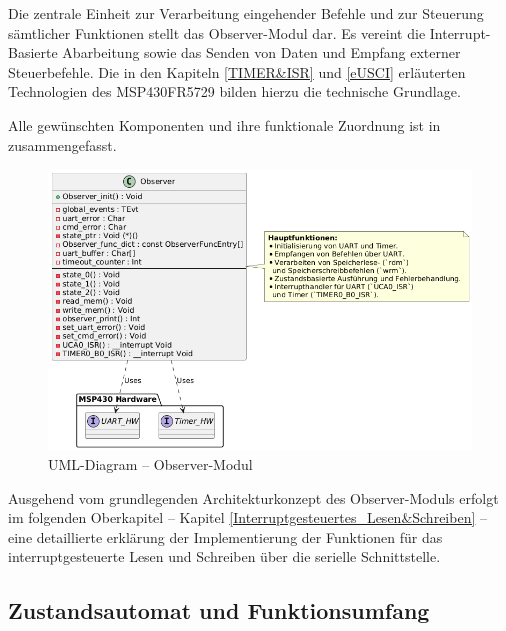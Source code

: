 Die zentrale Einheit zur Verarbeitung eingehender Befehle und zur Steuerung s\"amtlicher Funktionen stellt das Observer-Modul dar. Es vereint die Interrupt-Basierte Abarbeitung sowie das Senden von Daten und Empfang externer Steuerbefehle. Die in den Kapiteln \ref{TIMER&ISR} und \ref{eUSCI} erl\"auterten Technologien des MSP430FR5729 bilden hierzu die technische Grundlage.

Alle gew\"unschten Komponenten und ihre funktionale Zuordnung ist in  zusammengefasst.

\begin{figure}[h!]
	\centering
	\includegraphics[width=1.0\textwidth]{../Bilder/observer_class_diagram.png}
	\caption{UML-Diagram -- Observer-Modul}
	\label{fig:UmlDiagram_ObserverModul}
\end{figure}

Ausgehend vom grundlegenden Architekturkonzept des Observer-Moduls erfolgt im folgenden Oberkapitel -- Kapitel \ref{Interruptgesteuertes_Lesen&Schreiben} -- eine detaillierte erkl\"arung der Implementierung der Funktionen f\"ur das interruptgesteuerte Lesen und Schreiben \"uber die serielle Schnittstelle.

\subsection{Zustandsautomat und Funktionsumfang}
\label{ZustaendeUndFunktionen}

